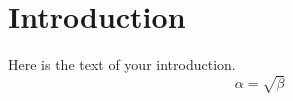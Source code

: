 \section{Introduction}
Here is the text of your introduction.
\begin{equation}
    \label{simple_equation}
    \alpha = \sqrt{ \beta }
\end{equation}

